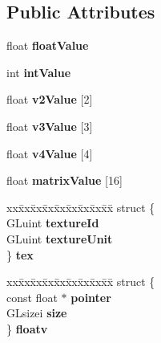 \subsection*{Public Attributes}
\begin{DoxyCompactItemize}
\item 
\mbox{\label{unionUniformValue_1_1U_a15df45919d517109000e87c41c96cea3}} 
float {\bfseries float\+Value}
\item 
\mbox{\label{unionUniformValue_1_1U_a8f1ab8efa74fc1d92af8d8e7261bce88}} 
int {\bfseries int\+Value}
\item 
\mbox{\label{unionUniformValue_1_1U_a4fd13530a724cd9fcd0afcd6566a1ca2}} 
float {\bfseries v2\+Value} \mbox{[}2\mbox{]}
\item 
\mbox{\label{unionUniformValue_1_1U_a5599fa3a0d325c3ab7cd9e10a399ebf9}} 
float {\bfseries v3\+Value} \mbox{[}3\mbox{]}
\item 
\mbox{\label{unionUniformValue_1_1U_a5aa6e8a1824866911168c265051f9cb3}} 
float {\bfseries v4\+Value} \mbox{[}4\mbox{]}
\item 
\mbox{\label{unionUniformValue_1_1U_a2d9ad562a7f7aeab85b85e0e0832b3d0}} 
float {\bfseries matrix\+Value} \mbox{[}16\mbox{]}
\item 
\mbox{\label{unionUniformValue_1_1U_ac7f3cdf23cf46f3a0e90ecdd895ff9cd}} 
\begin{tabbing}
xx\=xx\=xx\=xx\=xx\=xx\=xx\=xx\=xx\=\kill
struct \{\\
\>GLuint {\bfseries textureId}\\
\>GLuint {\bfseries textureUnit}\\
\} {\bfseries tex}\\

\end{tabbing}\item 
\mbox{\label{unionUniformValue_1_1U_a9a1542128a1b1d86687678f23411dd76}} 
\begin{tabbing}
xx\=xx\=xx\=xx\=xx\=xx\=xx\=xx\=xx\=\kill
struct \{\\
\>const float $\ast$ {\bfseries pointer}\\
\>GLsizei {\bfseries size}\\
\} {\bfseries floatv}\\


\end{tabbing}
\end{DoxyCompactItemize}
